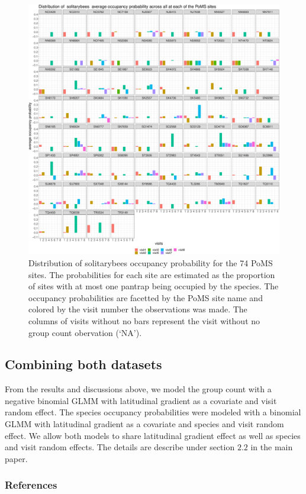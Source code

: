 \documentclass[
]{article}
\begin{document}
\begin{figure}

{\centering \includegraphics{SupplementaryInformationOne_files/figure-pdf/fig-sbSOPlot-1.pdf}

}

\caption{\label{fig-sbSOPlot}Distribution of solitarybees occupancy
probability for the 74 PoMS sites. The probabilities for each site are
estimated as the proportion of sites with at most one pantrap being
occupied by the species. The occupancy probabilities are facetted by the
PoMS site name and colored by the visit number the observations was
made. The columns of visits without no bars represent the visit without
no group count obervation (`NA').}

\end{figure}

\hypertarget{combining-both-datasets}{%
\subsection{Combining both datasets}\label{combining-both-datasets}}

From the results and discussions above, we model the group count with a
negative binomial GLMM with latitudinal gradient as a covariate and
visit random effect. The species occupancy probabilities were modeled
with a binomial GLMM with latitudinal gradient as a covariate and
species and visit random effect. We allow both models to share
latitudinal gradient effect as well as species and visit random effects.
The details are describe under section \(2.2\) in the main paper.

\hypertarget{references}{%
\subsubsection{References}\label{references}}

\renewcommand{\bibsection}{}

\end{document}
